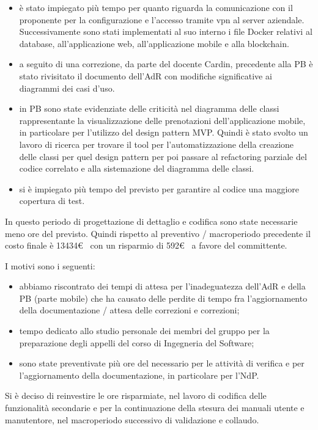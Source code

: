 \begin{itemize}
	\item è stato impiegato più tempo per quanto riguarda la comunicazione con il proponente per la configurazione e l'accesso tramite vpn al server aziendale. Successivamente sono stati implementati al suo interno i file Docker relativi al database, all'applicazione web, all'applicazione mobile e alla blockchain.
	\item a seguito di una correzione, da parte del docente Cardin, precedente alla PB è stato rivisitato 
	il documento dell'AdR con modifiche significative ai diagrammi dei casi d'uso.	
	\item in PB sono state evidenziate delle criticità nel diagramma delle classi rappresentante la visualizzazione delle prenotazioni dell'applicazione mobile, in particolare per l'utilizzo del design pattern MVP. Quindi è stato svolto un lavoro di ricerca per trovare il tool per l'automatizzazione della creazione delle classi per
	quel design pattern per poi passare al refactoring parziale del codice correlato e alla sistemazione del diagramma delle classi.
	\item si è impiegato più tempo del previsto per garantire al codice una maggiore copertura di test.
\end{itemize}

In questo periodo di progettazione di dettaglio e codifica sono state necessarie meno ore del previsto. 
Quindi rispetto al preventivo / macroperiodo precedente il costo finale è 13434\euro~ con un risparmio di 592\euro~
a favore del committente.

I motivi sono i seguenti:
\begin{itemize}
	\item abbiamo riscontrato dei tempi di attesa per l'inadeguatezza dell'AdR e della PB (parte mobile) che ha causato delle perdite di tempo fra l'aggiornamento della documentazione / attesa delle correzioni e correzioni;
	\item tempo dedicato allo studio personale dei membri del gruppo per la preparazione degli appelli del corso di Ingegneria del Software;
	\item sono state preventivate più ore del necessario per le attività di verifica e per l’aggiornamento della documentazione, in particolare per l'NdP.
\end{itemize}

Si è deciso di reinvestire le ore risparmiate, nel lavoro di codifica delle funzionalità secondarie e per la continuazione della stesura dei manuali utente e manutentore, nel macroperiodo successivo di validazione e collaudo.
